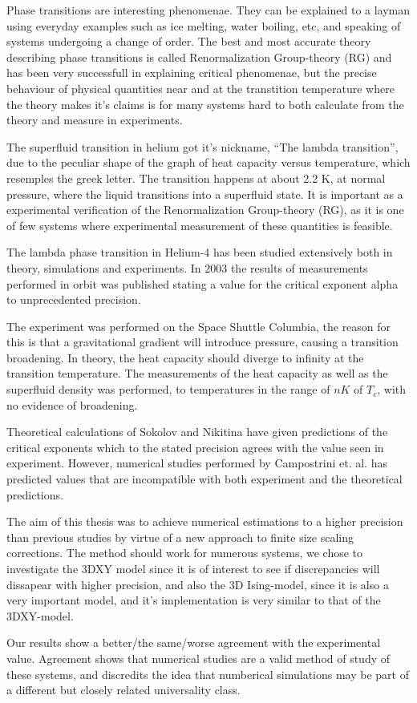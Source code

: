 %

Phase transitions are interesting phenomenae. They can be explained to a layman using everyday examples such as ice melting, water boiling, etc, and speaking of systems undergoing a change of order. The best and most accurate theory describing phase transitions is called Renormalization Group-theory (RG) and has been very successfull in explaining critical phenomenae, but the precise behaviour of physical quantities near and at the transtition temperature where the theory makes it's claims is for many systems hard to both calculate from the theory and measure in experiments.

The superfluid transition in helium got it's nickname, ``The lambda transition'', due to the peculiar shape of the graph of heat capacity versus temperature, which resemples the greek letter. The transition happens at about 2.2 K, at normal pressure, where the liquid transitions into a superfluid state. It is important as a experimental verification of the Renormalization Group-theory (RG), as it is one of few systems where experimental measurement of these quantities is feasible. 

The lambda phase transition in Helium-4 has been studied extensively both in theory, simulations and experiments. In 2003 the results of measurements performed in orbit was published\cite{Lipa2003} stating a value for the critical exponent alpha to unprecedented precision.

The experiment was performed on the Space Shuttle Columbia, the reason for this is that a gravitational gradient will introduce pressure, causing a transition broadening. In theory, the heat capacity should diverge to infinity at the transition temperature.
The measurements of the heat capacity as well as the superfluid density was performed, to temperatures in the range of $nK$ of $T_c$, with no evidence of broadening.

Theoretical calculations of Sokolov and Nikitina \cite{Sokolov2016} have given predictions of the critical exponents which to the stated precision agrees with the value seen in experiment.
However, numerical studies performed by Campostrini et. al. \cite{Campostrini2006} has predicted values that are incompatible with both experiment and the theoretical predictions. 

The aim of this thesis was to achieve numerical estimations to a higher precision than previous studies by virtue of a new approach to finite size scaling corrections. The method should work for numerous systems, we chose to investigate the 3DXY model since it is of interest to see if discrepancies will dissapear with higher precision, and also the 3D Ising-model, since it is also a very important model, and it's implementation is very similar to that of the 3DXY-model. 

Our results show a better/the same/worse agreement with the experimental value. Agreement shows that numerical studies are a valid method of study of these systems, and discredits the idea that numberical simulations may be part of a different but closely related universality class.


